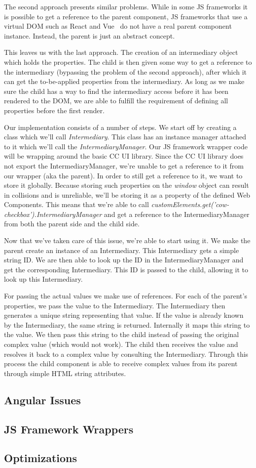 {	The second approach presents similar problems. While in some JS frameworks it is possible to get a reference to the parent component, JS frameworks that use a virtual DOM such as React and Vue~ do not have a real parent component instance. Instead, the parent is just an abstract concept.

	This leaves us with the last approach. The creation of an intermediary object which holds the properties. The child is then given some way to get a reference to the intermediary (bypassing the problem of the second approach), after which it can get the to-be-applied properties from the intermediary. As long as we make sure the child has a way to find the intermediary access before it has been rendered to the DOM, we are able to fulfill the requirement of defining all properties before the first render.
}{
	Our implementation consists of a number of steps. We start off by creating a class which we'll call \emph{Intermediary}. This class has an instance manager attached to it which we'll call the \emph{IntermediaryManager}. Our JS framework wrapper code will be wrapping around the basic CC UI library. Since the CC UI library does not export the IntermediaryManager, we're unable to get a reference to it from our wrapper (aka the parent). In order to still get a reference to it, we want to store it globally. Because storing such properties on the \emph{window} object can result in collisions and is unreliable, we'll be storing it as a property of the defined Web Components. This means that we're able to call \emph{customElements.get('cow-checkbox').IntermediaryManager} and get a reference to the IntermediaryManager from both the parent side and the child side.

	Now that we've taken care of this issue, we're able to start using it. We make the parent create an instance of an Intermediary. This Intermediary gets a simple string ID\@. We are then able to look up the ID in the IntermediaryManager and get the corresponding Intermediary. This ID is passed to the child, allowing it to look up this Intermediary.

	For passing the actual values we make use of references. For each of the parent's properties, we pass the value to the Intermediary. The Intermediary then generates a unique string representing that value. If the value is already known by the Intermediary, the same string is returned. Internally it maps this string to the value. We then pass this string to the child instead of passing the original complex value (which would not work). The child then receives the value and resolves it back to a complex value by consulting the Intermediary. Through this process the child component is able to receive complex values from its parent through simple HTML string attributes.
}

\subsection{Angular Issues}
\todo{}

\subsection{JS Framework Wrappers}
\todo{}

\subsection{Optimizations}
\todo{}